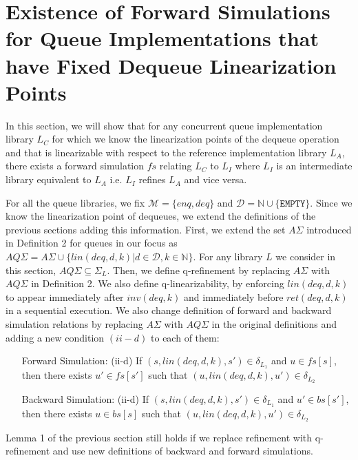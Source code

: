 \section{Existence of Forward Simulations for Queue Implementations that have Fixed Dequeue Linearization Points}
In this section, we will show that for any concurrent queue implementation library $L_C$ for which we know the linearization points of the dequeue operation and that is linearizable with respect to the reference implementation library $L_A$, there exists a forward simulation $fs$ relating $L_C$ to $L_I$ where $L_I$ is an intermediate library equivalent to $L_A$ i.e. $L_I$ refines $L_A$ and vice versa.  

For all the queue libraries, we fix $\mathcal{M} = \{ enq, deq \}$ and $\mathcal{D} = \mathbb{N} \cup \{\texttt{EMPTY} \}$. Since we know the linearization point of dequeues, we extend the definitions of the previous sections adding this information. First, we extend the set $A\Sigma$ introduced in Definition 2 for queues in our focus as $AQ\Sigma = A\Sigma \cup \{lin(deq,d,k)| d \in \mathcal{D}, k \in \mathbb{N}\}$. For any library $L$ we consider in this section, $AQ\Sigma \subseteq \Sigma_L$. Then, we define q-refinement by replacing $A\Sigma$ with $AQ\Sigma$ in Definition 2. We also define q-linearizability, by enforcing $lin(deq,d,k)$ to appear immediately after $inv(deq,k)$ and immediately before $ret(deq,d,k)$ in a sequential execution. We also change definition of forward and backward simulation relations by replacing $A\Sigma$ with $AQ\Sigma$ in the original definitions and adding a new condition $(ii-d)$ to each of them:
\begin{itemize}
\item[Forward Simulation: (ii-d)] If $(s, lin(deq,d,k), s') \in \delta_{L_1}$ and $u \in fs[s]$, then there exists $u' \in fs[s']$ such that $(u, lin(deq,d,k), u') \in \delta_{L_2}$
\item[Backward Simulation: (ii-d)] If $(s, lin(deq,d,k), s') \in \delta_{L_1}$ and $u' \in bs[s']$, then there exists $u \in bs[s]$ such that $(u, lin(deq,d,k), u') \in \delta_{L_2}$
\end{itemize}
Lemma 1 of the previous section still holds if we replace refinement with q-refinement and use new definitions of backward and forward simulations.

